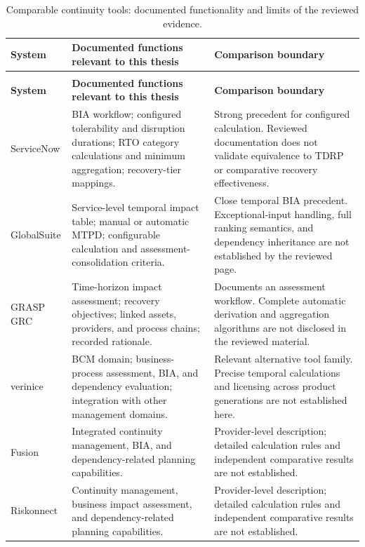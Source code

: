 \begingroup
\small
\setlength{\tabcolsep}{4pt}
\renewcommand{\arraystretch}{1.15}
\begin{longtable}{>{\raggedright\arraybackslash}p{2.5cm}>{\raggedright\arraybackslash}p{6.0cm}>{\raggedright\arraybackslash}p{6.0cm}}
\caption{Comparable continuity tools: documented functionality and limits of the reviewed evidence.}\label{tab:lr_tools}\\
\toprule
\textbf{System} & \textbf{Documented functions relevant to this thesis} & \textbf{Comparison boundary} \\
\midrule
\endfirsthead
\multicolumn{3}{l}{Table \thetable\ continued}\\
\toprule
\textbf{System} & \textbf{Documented functions relevant to this thesis} & \textbf{Comparison boundary} \\
\midrule
\endhead
\bottomrule
\endfoot
ServiceNow \cite{servicenow2025bia,servicenow2025rto} & BIA workflow; configured tolerability and disruption durations; RTO category calculations and minimum aggregation; recovery-tier mappings. & Strong precedent for configured calculation. Reviewed documentation does not validate equivalence to TDRP or comparative recovery effectiveness. \\
GlobalSuite \cite{globalsuite2025prebia} & Service-level temporal impact table; manual or automatic MTPD; configurable calculation and assessment-consolidation criteria. & Close temporal BIA precedent. Exceptional-input handling, full ranking semantics, and dependency inheritance are not established by the reviewed page. \\
GRASP GRC \cite{grasp2025bia} & Time-horizon impact assessment; recovery objectives; linked assets, providers, and process chains; recorded rationale. & Documents an assessment workflow. Complete automatic derivation and aggregation algorithms are not disclosed in the reviewed material. \\
verinice \cite{verinice2025bcm} & BCM domain; business-process assessment, BIA, and dependency evaluation; integration with other management domains. & Relevant alternative tool family. Precise temporal calculations and licensing across product generations are not established here. \\
Fusion \cite{fusion2026bcm} & Integrated continuity management, BIA, and dependency-related planning capabilities. & Provider-level description; detailed calculation rules and independent comparative results are not established. \\
Riskonnect \cite{riskonnect2026bcm} & Continuity management, business impact assessment, and dependency-related planning capabilities. & Provider-level description; detailed calculation rules and independent comparative results are not established. \\
\end{longtable}
\endgroup
